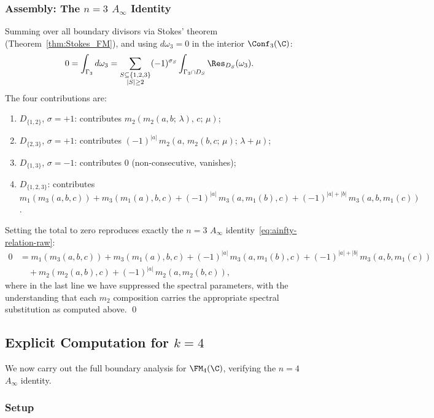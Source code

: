 \subsubsection{Assembly: The $n=3$ $A_\infty$ Identity}

\begin{proposition}[Complete $k=3$ verification; \ClaimStatusProvedHere]
\label{prop:k3_identity}
Summing over all boundary divisors via Stokes' theorem (Theorem~\ref{thm:Stokes_FM}), and using $d\omega_3 = 0$ in the interior $\Conf_3(\C)$:
\[
0 = \int_{\Gamma_3} d\omega_3 = \sum_{\substack{S \subseteq \{1,2,3\} \\ |S| \geq 2}} (-1)^{\sigma_S} \int_{\Gamma_3 \cap D_S} \Res_{D_S}(\omega_3).
\]
The four contributions are:
\begin{enumerate}[label=(\roman*)]
\item $D_{\{1,2\}}$, $\sigma = +1$: contributes $m_2(m_2(a,b;\,\lambda),\, c;\, \mu)$;
\item $D_{\{2,3\}}$, $\sigma = +1$: contributes $(-1)^{|a|}\, m_2(a,\, m_2(b,c;\,\mu);\, \lambda+\mu)$;
\item $D_{\{1,3\}}$, $\sigma = -1$: contributes $0$ (non-consecutive, vanishes);
\item $D_{\{1,2,3\}}$: contributes $m_1(m_3(a,b,c)) + m_3(m_1(a),b,c) + (-1)^{|a|}\, m_3(a,m_1(b),c) + (-1)^{|a|+|b|}\, m_3(a,b,m_1(c))$.
\end{enumerate}
Setting the total to zero reproduces exactly the $n=3$ $A_\infty$ identity~\eqref{eq:ainfty-relation-raw}:
\begin{align*}
0 &= m_1(m_3(a,b,c)) + m_3(m_1(a),b,c) + (-1)^{|a|}\, m_3(a,m_1(b),c) + (-1)^{|a|+|b|}\, m_3(a,b,m_1(c)) \\
&\quad + m_2(m_2(a,b),c) + (-1)^{|a|}\, m_2(a,m_2(b,c)),
\end{align*}
where in the last line we have suppressed the spectral parameters, with the understanding that each $m_2$ composition carries the appropriate spectral substitution as computed above. \qed
\end{proposition}

\subsection{Explicit Computation for $k=4$}
\label{subsec:k4_computation}

We now carry out the full boundary analysis for $\FM_4(\C)$, verifying the $n=4$ $A_\infty$ identity.

\subsubsection{Setup}

